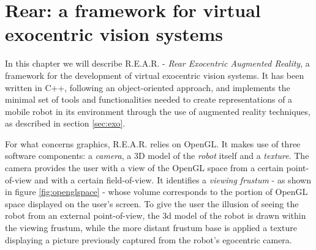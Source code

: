 \section{\textsf{Rear:} a framework for virtual exocentric vision systems}
\label{sec:rear}

In this chapter we will describe \textsf{R.E.A.R.} - 
\textit{Rear Exocentric Augmented Reality}, a framework 
for the development of virtual exocentric vision systems.
%
It has been written in C++, following an object-oriented 
approach, and implements the minimal set of tools and functionalities 
needed to create representations of a mobile robot in its environment 
through the use of augmented reality techniques, as described in 
section \ref{sec:exo}.
%

%
For what concerns graphics, \textsf{R.E.A.R.} relies on OpenGL.
It makes use of three software components: a \textit{camera}, 
a 3D model of the \textit{robot} itself and a \textit{texture}.
%
The camera provides the user with a view of the OpenGL space 
from a certain point-of-view and with a certain field-of-view. 
It identifies a \textit{viewing frustum} - as shown in figure 
\ref{fig:openglspace} - whose volume corresponds to the 
portion of OpenGL space displayed on the user's screen.
%
To give the user the illusion of seeing the robot from an 
external point-of-view, the 3d model of the robot is drawn 
within the viewing frustum, while the more distant frustum base 
is applied a texture displaying a picture previously 
captured from the robot's egocentric camera.
%

